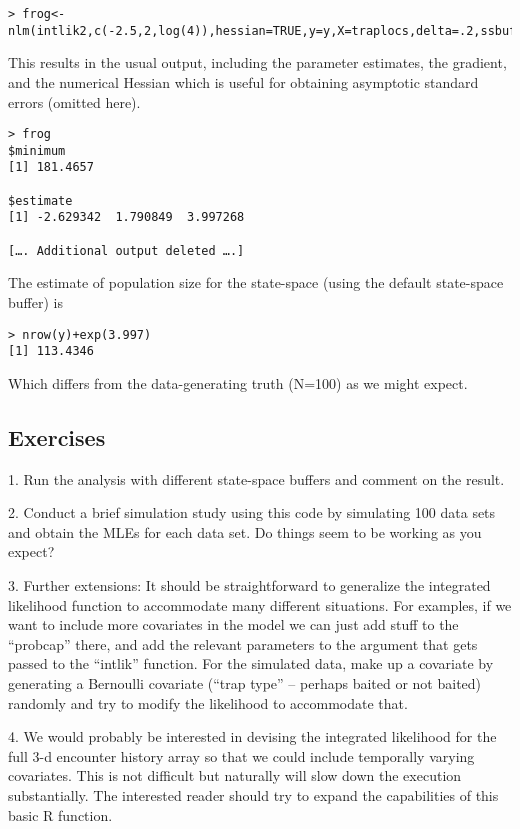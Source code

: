 \begin{verbatim}
> frog<-nlm(intlik2,c(-2.5,2,log(4)),hessian=TRUE,y=y,X=traplocs,delta=.2,ssbuffer=2)
\end{verbatim}

This results in the usual output, including the parameter estimates,
the gradient, and the numerical Hessian which is useful for obtaining
asymptotic standard errors (omitted here).

\begin{verbatim}
> frog
$minimum
[1] 181.4657

$estimate
[1] -2.629342  1.790849  3.997268

[…. Additional output deleted ….]
\end{verbatim}

The estimate of population size for the state-space (using the default state-space buffer) is

\begin{verbatim}
> nrow(y)+exp(3.997)
[1] 113.4346
\end{verbatim}

Which differs from the data-generating truth (N=100) as we might expect. 

\subsection{
Exercises}


1.	Run the analysis with different state-space buffers and comment on the result. 


2.	Conduct a brief simulation study using this code by simulating 100 data sets and obtain the MLEs for each data set. Do things seem to be working as you expect?


3.	Further extensions: It should be straightforward to generalize the integrated likelihood function to accommodate many different situations. For examples,  if we want to include more covariates in the model we can just add stuff to the “probcap” there, and add the relevant parameters to the argument that gets passed to the “intlik” function.  For the simulated data, make up a covariate by generating a Bernoulli covariate (“trap type” – perhaps baited or not baited) randomly and try to modify the likelihood to accommodate that. 



4.	We would probably be interested in devising the integrated likelihood for the full 3-d encounter history array so that we could include temporally varying covariates. This is not difficult but naturally will slow down the execution substantially. The interested reader should try to expand the capabilities of this basic R function.

